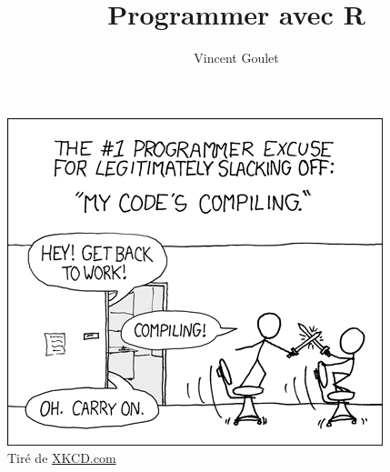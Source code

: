 \documentclass[letterpaper,11pt,x11names,english,french]{memoir}
\title{Programmer avec R}
\author{Vincent Goulet}
\theoremstyle{remark}
\begin{document}
\frontmatter

\pagestyle{empty}


\null\cleardoublepage           %


\clearpage

\pagestyle{companion}

%
\tableofcontents*

\cleartoverso
\thispagestyle{empty}
\begin{vplace}[0.45]
  \centering
  \begin{minipage}{0.9\linewidth}
    \includegraphics{compiling.png} \\
    \footnotesize\sffamily%
    Tiré de \href{http://xkcd.com/303/}{XKCD.com}
  \end{minipage}
\end{vplace}

\mainmatter













\appendix






\cleardoublepage
\printindex

\pagestyle{empty}

\cleartoverso


\cleartoverso

\end{document}
